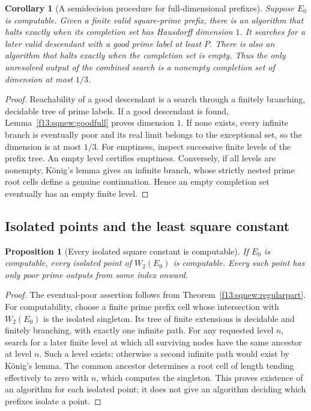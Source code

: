 \documentclass[11pt,a4paper]{article}
\newtheorem{proposition}[theorem]{Proposition}
\newtheorem{corollary}[theorem]{Corollary}
\theoremstyle{definition}
\theoremstyle{remark}
\numberwithin{equation}{section}
\begin{document}
\begin{corollary}[A semidecision procedure for full-dimensional prefixes]
\label{f13:sqnew:semidecision}
Suppose $E_0$ is computable. Given a finite valid square-prime prefix,
there is an algorithm that halts exactly when its completion set has
Hausdorff dimension $1$. It searches for a later valid descendant with
a good prime label at least $P$.
There is also an algorithm that halts exactly when the completion set
is empty. Thus the only unresolved output of the combined search is a
nonempty completion set of dimension at most $1/3$.
\end{corollary}
\begin{proof}
Reachability of a good descendant is a search through a finitely
branching, decidable tree of prime labels. If a good descendant is found,
Lemma~\ref{f13:sqnew:goodfull} proves dimension $1$. If none exists, every
infinite branch is eventually poor and its real limit belongs to the
exceptional set, so the dimension is at most $1/3$.
For emptiness, inspect successive finite levels of the prefix tree.
An empty level certifies emptiness. Conversely, if all levels are
nonempty, K\"onig's lemma gives an infinite branch, whose strictly
nested prime root cells define a genuine continuation. Hence an empty
completion set eventually has an empty finite level.
\end{proof}

\subsection{Isolated points and the least square constant}

\begin{proposition}[Every isolated square constant is computable]
\label{f13:sqnew:isolatedcomputable}
If $E_0$ is computable, every isolated point of $W_2(E_0)$ is computable.
Every such point has only poor prime outputs from some index onward.
\end{proposition}
\begin{proof}
The eventual-poor assertion follows from
Theorem~\ref{f13:sqnew:regularpart}. For computability, choose a finite prime
prefix cell whose intersection with $W_2(E_0)$ is the isolated singleton.
Its tree of finite extensions is decidable and finitely branching, with
exactly one infinite path. For any requested level $n$, search for a
later finite level at which all surviving nodes have the same ancestor
at level $n$. Such a level exists: otherwise a second infinite path
would exist by K\"onig's lemma. The common ancestor determines a root
cell of length tending effectively to zero with $n$, which computes the
singleton. This proves existence of an algorithm for each isolated
point; it does not give an algorithm deciding which prefixes isolate a
point.
\end{proof}
\end{document}
